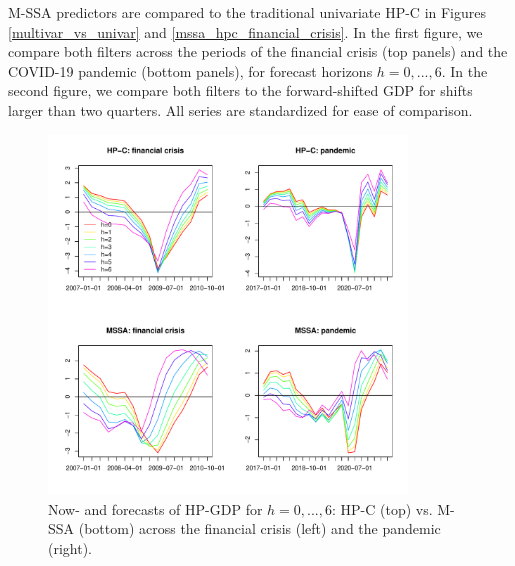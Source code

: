\documentclass[11pt,a4paper]{article}
\begin{document}
M-SSA predictors are compared to the traditional univariate HP-C in Figures  \eqref{multivar_vs_univar} and \eqref{mssa_hpc_financial_crisis}. In the first figure, we compare both filters across the periods of the financial crisis (top panels) and the COVID-19 pandemic (bottom panels), for forecast horizons $h=0,...,6$. In the second figure, we compare both filters to the forward-shifted GDP for shifts larger than two quarters. All series are standardized for ease of comparison. 

\begin{figure}[H]
    \begin{center}
        \includegraphics[width=0.85\textwidth]{./Figures/multivar_vs_univar.pdf}
        \caption{Now- and forecasts of HP-GDP for $h=0,...,6$: HP-C (top) vs. M-SSA (bottom) across the financial crisis (left) and the pandemic (right).
        \label{multivar_vs_univar}}
    \end{center}
\end{figure}
\end{document}
